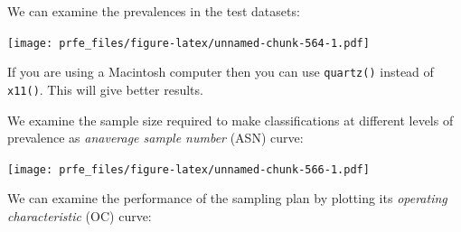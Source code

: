 \documentclass[12pt,a4paper]{book}
\newenvironment{Shaded}{\begin{snugshade}}{\end{snugshade}}
\newcommand{\KeywordTok}[1]{\textcolor[rgb]{0.13,0.29,0.53}{\textbf{#1}}}
\newcommand{\DataTypeTok}[1]{\textcolor[rgb]{0.13,0.29,0.53}{#1}}
\newcommand{\StringTok}[1]{\textcolor[rgb]{0.31,0.60,0.02}{#1}}
\newcommand{\OperatorTok}[1]{\textcolor[rgb]{0.81,0.36,0.00}{\textbf{#1}}}
\newcommand{\NormalTok}[1]{#1}
\theoremstyle{definition}
\theoremstyle{definition}
\theoremstyle{definition}
\theoremstyle{remark}
\begin{document}
We can examine the prevalences in the test datasets:

\begin{Shaded}
\end{Shaded}

\texttt{[image: prfe\_files/figure-latex/unnamed-chunk-564-1.pdf]}

If you are using a Macintosh computer then you can use \texttt{quartz()}
instead of \texttt{x11()}. This will give better results.

We examine the sample size required to make classifications at different
levels of prevalence as \emph{anaverage sample number} (ASN) curve:

\begin{Shaded}
\end{Shaded}

\texttt{[image: prfe\_files/figure-latex/unnamed-chunk-566-1.pdf]}

We can examine the performance of the sampling plan by plotting its
\emph{operating characteristic} (OC) curve:

\begin{Shaded}
\end{Shaded}
\end{document}

